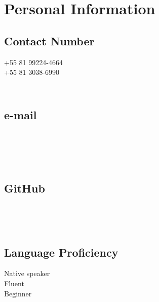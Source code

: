 \documentclass[]{deedy-resume-openfont}
\begin{document}
%
%

%
%



%
%

\begin{minipage}[t]{0.33\textwidth} 



\section{Personal Information} 
\subsection{Contact Number}
+55 81 99224-4664\\
+55 81 3038-6990\\

\subsection{\\e-mail}
\href{mailto:cardosolucas92@gmail.com}{} \\
\href{mailto:lccao@cin.ufpe.br}{} \\

\subsection{\\GitHub}
\href{https://github.com/Lucas-CardosoO}{}\\ 

\subsection{\\Language Proficiency}
{} Native speaker\\
{} Fluent\\
{} Beginner
\sectionsep



\end{minipage}
\end{document}
